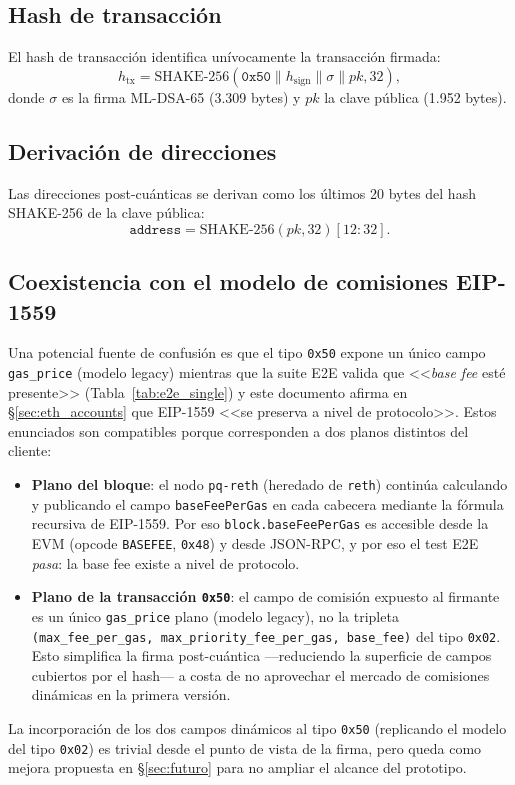 \subsection{Hash de transacción}

El hash de transacción identifica unívocamente la transacción firmada:
\begin{equation}
  h_{\text{tx}} = \text{SHAKE-256}(\texttt{0x50} \| h_{\text{sign}} \| \sigma \| \mathit{pk}, 32),
\end{equation}
donde $\sigma$ es la firma ML-DSA-65 (3.309 bytes) y $\mathit{pk}$ la clave pública (1.952 bytes).

\subsection{Derivación de direcciones}

Las direcciones post-cuánticas se derivan como los últimos 20 bytes del hash SHAKE-256 de la clave pública:
\begin{equation}
  \texttt{address} = \text{SHAKE-256}(\mathit{pk}, 32)[12{:}32].
  \label{eq:pq_address}
\end{equation}

\subsection{Coexistencia con el modelo de comisiones EIP-1559}
\label{sec:tx_eip1559}

Una potencial fuente de confusión es que el tipo \texttt{0x50} expone un único campo \texttt{gas\_price} (modelo legacy) mientras que la suite E2E valida que <<\emph{base fee} esté presente>> (Tabla~\ref{tab:e2e_single}) y este documento afirma en \S\ref{sec:eth_accounts} que EIP-1559 <<se preserva a nivel de protocolo>>. Estos enunciados son compatibles porque corresponden a dos planos distintos del cliente:
\begin{itemize}
  \item \textbf{Plano del bloque}: el nodo \texttt{pq-reth} (heredado de \texttt{reth}) continúa calculando y publicando el campo \texttt{baseFeePerGas} en cada cabecera mediante la fórmula recursiva de EIP-1559. Por eso \texttt{block.baseFeePerGas} es accesible desde la EVM (opcode \texttt{BASEFEE}, \texttt{0x48}) y desde JSON-RPC, y por eso el test E2E \emph{pasa}: la base fee existe a nivel de protocolo.
  \item \textbf{Plano de la transacción \texttt{0x50}}: el campo de comisión expuesto al firmante es un único \texttt{gas\_price} plano (modelo legacy), no la tripleta \texttt{(max\_fee\_per\_gas, max\_priority\_fee\_per\_gas, base\_fee)} del tipo \texttt{0x02}. Esto simplifica la firma post-cuántica ---reduciendo la superficie de campos cubiertos por el hash--- a costa de no aprovechar el mercado de comisiones dinámicas en la primera versión.
\end{itemize}
La incorporación de los dos campos dinámicos al tipo \texttt{0x50} (replicando el modelo del tipo \texttt{0x02}) es trivial desde el punto de vista de la firma, pero queda como mejora propuesta en \S\ref{sec:futuro} para no ampliar el alcance del prototipo.

